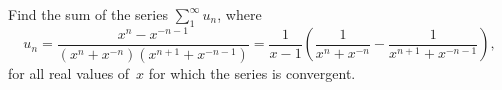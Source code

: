Find the sum of the series $\sum\limits_{1}^{\infty} u_{n}$, where
\[
u_{n} = \frac{x^{n} - x^{-n-1}}{(x^{n} + x^{-n})(x^{n+1} + x^{-n-1}) }
  = \frac{1}{x - 1}
      \left(\frac{1}{x^{n} + x^{-n}} - \frac{1}{x^{n+1} + x^{-n-1}}\right),
\]
for all real values of~$x$ for which the series is convergent. 

